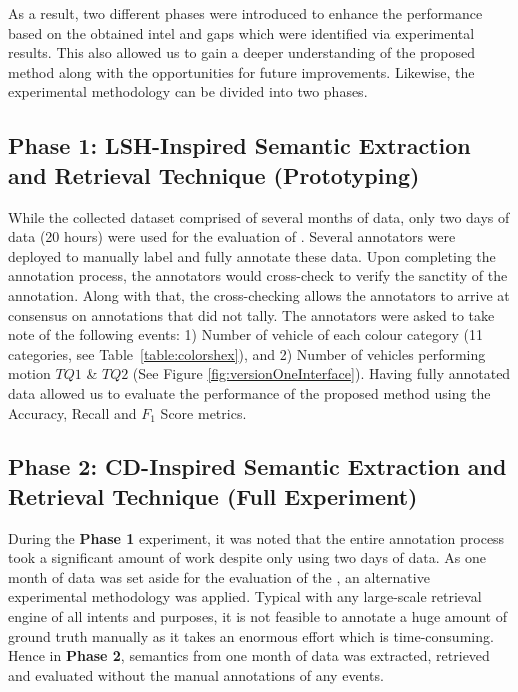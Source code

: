 As a result, two different phases were introduced to enhance the performance based on the obtained intel and gaps which were identified via experimental results. This also allowed us to gain a deeper understanding of the proposed method along with the opportunities for future improvements.
Likewise, the experimental methodology can be divided into two phases.


\subsection{Phase 1: LSH-Inspired Semantic Extraction and Retrieval Technique (Prototyping)}
While the collected dataset comprised of several months of data, only two days of data (20 hours) were used for the evaluation of \versionOneRet. Several annotators were deployed to manually label and fully annotate these data. Upon completing the annotation process, the annotators would cross-check to verify the sanctity of the annotation.
Along with that, the cross-checking allows the annotators to arrive at consensus on annotations that did not tally. The annotators were asked to take note of the following events:
1) Number of vehicle of each colour category (11 categories, see Table~\ref{table:colorshex}), and 2) Number of vehicles performing motion $TQ1$ \& $TQ2$ (See Figure \ref{fig:versionOneInterface}).
Having fully annotated data allowed us to evaluate the performance of the proposed method using the Accuracy, Recall and $F_1$ Score metrics.

\subsection{Phase 2: CD-Inspired Semantic Extraction and Retrieval Technique (Full Experiment)}

During the \textbf{Phase 1} experiment, it was noted that the entire annotation process took a significant amount of work despite only using two days of data. As one month of data was set aside for the evaluation of the \versionTwoRet, an alternative experimental methodology was applied.
Typical with any large-scale retrieval engine of all intents and purposes, it is not feasible to annotate a huge amount of ground truth manually as it takes an enormous effort which is time-consuming.
Hence in \textbf{Phase 2}, semantics from one month of data was extracted, retrieved and evaluated without the manual annotations of any events.

